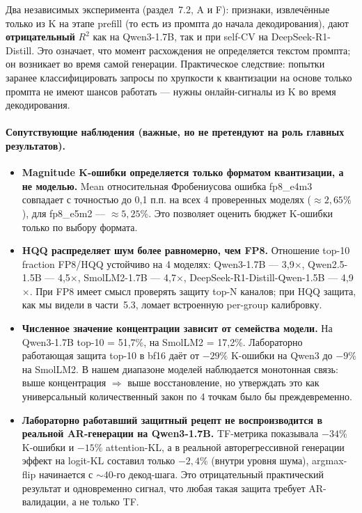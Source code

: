 \documentclass[a4paper,12pt]{article}
\begin{document}
\begin{description}[leftmargin=0cm,style=nextline]
\item[\textbf{Ф.3. Эмпирический факт: FDP не предсказуем по признакам
из prompt-only / prefill.}]
Два независимых эксперимента (раздел~7.2, A и F): признаки, извлечённые
только из K на этапе prefill (то есть из промпта до начала декодирования),
дают \textbf{отрицательный} $R^2$ как на Qwen3-1.7B, так и при
self-CV на DeepSeek-R1-Distill. Это означает, что момент расхождения
не определяется текстом промпта; он возникает во время самой
генерации. Практическое следствие: попытки заранее классифицировать
запросы по хрупкости к квантизации на основе только промпта не имеют
шансов работать --- нужны онлайн-сигналы из K во время декодирования.
\end{description}

\paragraph{Сопутствующие наблюдения (важные, но не претендуют на роль главных результатов).}
\begin{itemize}[leftmargin=*]
\item \textbf{Magnitude K-ошибки определяется только форматом
  квантизации, а не моделью.} Mean относительная Фробениусова ошибка
  fp8\_e4m3 совпадает с точностью до 0,1 п.п. на всех 4 проверенных
  моделях ($\approx 2{,}65\%$), для fp8\_e5m2 --- $\approx 5{,}25\%$.
  Это позволяет оценить бюджет K-ошибки только по выбору формата.

\item \textbf{HQQ распределяет шум более равномерно, чем FP8.} Отношение
  top-10 fraction FP8/HQQ устойчиво на 4 моделях:
  Qwen3-1.7B --- 3,9$\times$, Qwen2.5-1.5B --- 4,5$\times$,
  SmolLM2-1.7B --- 4,7$\times$, DeepSeek-R1-Distill-Qwen-1.5B --- 4,9$\times$.
  При FP8 имеет смысл проверять защиту top-N каналов; при HQQ защита,
  как мы видели в части~5.3, ломает встроенную per-group калибровку.

\item \textbf{Численное значение концентрации зависит от семейства
  модели.} На Qwen3-1.7B top-10 = 51,7\%, на SmolLM2 = 17,2\%. Лабораторно
  работающая защита top-10 в bf16 даёт от $-29\%$ K-ошибки на Qwen3 до
  $-9\%$ на SmolLM2. В нашем диапазоне моделей наблюдается монотонная
  связь: выше концентрация $\Rightarrow$ выше восстановление, но
  утверждать это как универсальный количественный закон по 4 точкам
  было бы преждевременно.

\item \textbf{Лабораторно работавший защитный рецепт не воспроизводится
  в реальной AR-генерации на Qwen3-1.7B.} TF-метрика показывала
  $-34\%$ K-ошибки и $-15\%$ attention-KL, а в реальной авторегрессивной
  генерации эффект на logit-KL составил только $-2{,}4\%$ (внутри
  уровня шума), argmax-flip начинается с $\sim 40$-го декод-шага. Это
  отрицательный практический результат и одновременно сигнал, что любая
  такая защита требует AR-валидации, а не только TF.
\end{itemize}
\end{document}
